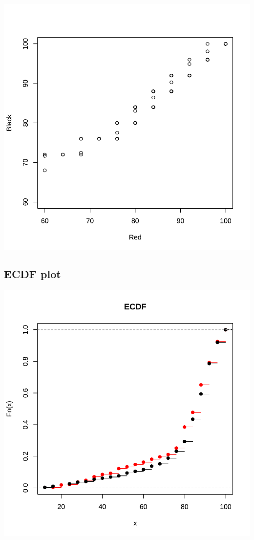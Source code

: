 \documentclass[
]{book}
\begin{document}
\includegraphics{Quiz_report_2025_files/figure-latex/qqplots-1.pdf}

\subsection{ECDF plot}\label{ecdf-plot}

\includegraphics{Quiz_report_2025_files/figure-latex/ECDF-1.pdf}
\end{document}
